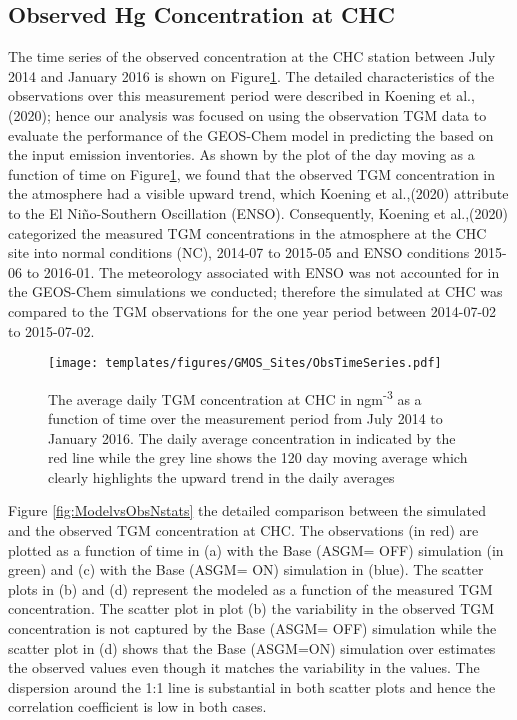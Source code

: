 \subsection{Observed Hg Concentration at CHC}
\begin{flushleft}
The time series of the observed concentration at the CHC station between July 2014 and January 2016 is shown on Figure\ref{fig:ObsTseries}. The detailed characteristics of the observations over this measurement period were described in Koening et al.,(2020); hence our analysis was focused on using the observation TGM data to evaluate the performance of the GEOS-Chem model in predicting the \hg based on the input \hg emission inventories. As shown by the plot of the  day moving as a function of time on Figure\ref{fig:ObsTseries}, we found that the observed TGM concentration in the atmosphere had a visible upward trend, which Koening et al.,(2020) attribute to the El Niño-Southern Oscillation (ENSO). Consequently, Koening et al.,(2020) categorized the measured TGM concentrations in the atmosphere at the CHC site into normal conditions (NC), 2014-07 to 2015-05 and ENSO conditions  2015-06 to 2016-01. The meteorology associated with ENSO was not accounted for in the GEOS-Chem \hg simulations we conducted; therefore the simulated \hg  at CHC was compared to the TGM observations for the one year period between 2014-07-02 to 2015-07-02.
\end{flushleft}

\begin{figure}[H]
  \texttt{[image: templates/figures/GMOS\_Sites/ObsTimeSeries.pdf]}
 
  \caption{The average daily TGM concentration at CHC in ngm\textsuperscript{-3} as a function of time over the measurement period from July 2014 to January 2016. The daily average concentration in indicated by the red line while the grey line shows the 120 day moving average which clearly highlights the upward trend in the daily averages}
  \label{fig:ObsTseries}
  \centering
\end{figure}
\FloatBarrier

\begin{flushleft}
  Figure \ref{fig:ModelvsObsNstats} the detailed comparison between the simulated \hg  and the observed TGM concentration at CHC. The observations (in red) are plotted as a function of time in (a) with the Base (ASGM= OFF) simulation (in green) and (c) with the Base (ASGM= ON) simulation in (blue). The scatter plots in (b) and (d) represent the modeled \hg  as a function of the measured TGM concentration. The scatter plot in plot (b) the variability in the observed TGM concentration is not captured by the Base (ASGM= OFF) simulation while the scatter plot in (d) shows that the Base (ASGM=ON) simulation over estimates the observed values even though it matches the variability in the values. The dispersion around the 1:1 line is substantial in both scatter plots and hence the correlation coefficient is low in both cases. 
\end{flushleft}


